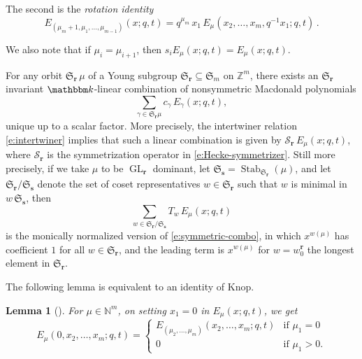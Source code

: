 \documentclass[12pt]{amsart}
\newtheorem{lemma}[thm]{Lemma}
\theoremstyle{definition}
\theoremstyle{remark}
\newcommand{\NN}{{\mathbb N}}
\newcommand{\ZZ}{{\mathbb Z}}
\newcommand{\kk}{{\mathbbm k}}
\newcommand{\rr}{{\mathbf r}}
\newcommand{\sS}{{\mathbf s}}
\newcommand{\Sfrak}{{\mathfrak S}}
\newcommand{\Scal}{{\mathcal S}}
\DeclareMathOperator{\GL}{GL}
\DeclareMathOperator{\Stab}{Stab}
\begin{document}
The second is the \emph{rotation identity}
\begin{equation}\label{e:rotation}
E_{(\mu _{m}+1,\mu _{1},\ldots,\mu _{m-1})}(x;q,t) = q^{\mu _{m}}\,
x_{1}\, E_{\mu }(x_{2},\ldots,x_{m},q^{-1} x_{1}; q,t)\, .
\end{equation}

We also note that if $\mu _{i} = \mu _{i+1}$, then $s_{i} E_{
\mu}(x;q,t) = E_{\mu }(x;q,t)$.

For any orbit $\Sfrak _{\rr }\, \mu $ of a Young subgroup $\Sfrak
_{\rr }\subseteq \Sfrak _{m}$ on $\ZZ ^{m}$, there exists an $\Sfrak
_{\rr }$ invariant $\kk $-linear combination of nonsymmetric
Macdonald polynomials
\begin{equation}\label{e:symmetric-combo}
\sum _{\gamma  \in \Sfrak _{\rr }\mu} c_{\gamma  }\, E_{\gamma }(x;q,t),
\end{equation}
unique up to a scalar factor.  More precisely, the intertwiner
relation \eqref{e:intertwiner} implies that such a linear combination
is given by $\Scal _{\rr } \, E_{\mu }(x;q,t)$, where $\Scal _{\rr }$
is the symmetrization operator in \eqref{e:Hecke-symmetrizer}.  Still
more precisely, if we take $\mu $ to be $\GL _{\rr }$ dominant, let
$\Sfrak _{\sS }= \Stab _{\Sfrak _{\rr }}(\mu )$, and let $\Sfrak _{\rr
}/\Sfrak _{\sS }$ denote the set of coset representatives $w\in \Sfrak
_{\rr }$ such that $w$ is minimal in $w\, \Sfrak _{\sS }$, then
\begin{equation}\label{e:monic-symmetric-combo}
\sum _{w\in \Sfrak _{\rr }/\Sfrak _{\sS }} T_{w}\, E_{\mu }(x;q,t)
\end{equation}
is the monically normalized version of \eqref{e:symmetric-combo}, in
which $x^{w(\mu )}$ has coefficient $1$ for all $w\in \Sfrak _{\rr }$,
and the leading term is $x^{w(\mu )}$ for $w = w_{0}^{\rr }$ the
longest element in $\Sfrak _{\rr }$.

The following lemma is equivalent to an identity of Knop.

\begin{lemma}[{\cite[Theorem~9.10]{Knop07}}]\label{lem:x1=0}
For $\mu \in \NN ^{m}$, on setting $x_{1} = 0$ in $E_{\mu }(x;q,t)$,
we get
\begin{equation}\label{e:x1=0}
E_{\mu }(0,x_{2},\ldots,x_{m};q,t) = \begin{cases}
E_{(\mu _{2},\ldots,\mu _{m})}(x_{2},\ldots,x_{m};q,t)&	\text{if $\mu
_{1} = 0$}\\
0&   \text{if $\mu _{1}>0$.}
\end{cases}
\end{equation}
\end{lemma}
\end{document}

